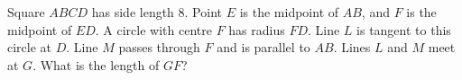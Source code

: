 Square $ABCD$ has side length $8$. Point $E$ is the midpoint of $AB$, and $F$ is the midpoint of $ED$. A circle with centre $F$ has radius $FD$. Line $L$ is tangent to this circle at $D$. Line $M$ passes through $F$ and is parallel to $AB$. Lines $L$ and $M$ meet at $G$. What is the length of $GF$?
